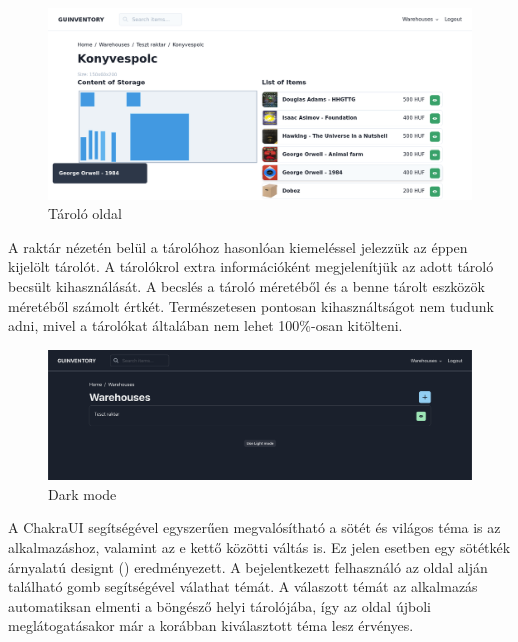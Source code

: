 \begin{figure}[!ht]
  \centering
  \includegraphics[width=150mm, keepaspectratio]{figures/storage.png}
  \caption{Tároló oldal}
  \label{fig:storage}
\end{figure}

A raktár nézetén belül a tárolóhoz hasonlóan kiemeléssel jelezzük az éppen kijelölt tárolót.
A tárolókrol extra információként megjelenítjük az adott tároló becsült kihasználását.
A becslés a tároló méretéből és a benne tárolt eszközök méretéből számolt értkét.
Természetesen pontosan kihasználtságot nem tudunk adni, mivel a tárolókat általában nem lehet 100\%-osan kitölteni.

\begin{figure}[!ht]
  \centering
  \includegraphics[width=150mm, keepaspectratio]{figures/dark_mode.png}
  \caption{Dark mode}
  \label{fig:darkMode}
\end{figure}
A ChakraUI segítségével egyszerűen megvalósítható a sötét és világos téma is az alkalmazáshoz, valamint az e kettő közötti váltás is.
Ez jelen esetben egy sötétkék árnyalatú designt () eredményezett. 
A bejelentkezett felhasználó az oldal alján található gomb segítségével válathat témát.
A válaszott témát az alkalmazás automatiksan elmenti a böngésző helyi tárolójába, így az oldal újboli meglátogatásakor már a korábban kiválasztott téma lesz érvényes.


